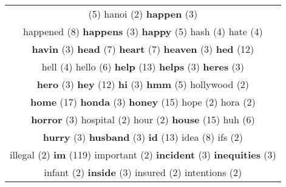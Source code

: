 \documentclass[12pt,a4paper]{article}
\begin{document}
\begin{center}
\begin{longtable}{|c|}
\footnotesize{(5)} {\footnotesize \textcolor{Verde} {hanoi}} \footnotesize{(2)} {\small \textcolor{Laranja} {\bf happen}} \footnotesize{(3)}  \\ {\huge \textcolor{Amarelo} {happened}} \footnotesize{(8)} {\small \textcolor{Laranja} {\bf happens}} \footnotesize{(3)} {\large \textcolor{Roxo} {\bf happy}} \footnotesize{(5)} {\normalsize \textcolor{VerdeLocao} {hash}} \footnotesize{(4)} {\normalsize \textcolor{VerdeLocao} {hate}} \footnotesize{(4)}  \\ {\small \textcolor{Laranja} {\bf havin}} \footnotesize{(3)} {\LARGE \textcolor{Rosa} {\bf head}} \footnotesize{(7)} {\LARGE \textcolor{Rosa} {\bf heart}} \footnotesize{(7)} {\small \textcolor{Laranja} {\bf heaven}} \footnotesize{(3)} {\Huge \textcolor{AzulEscuro} {\bf hed}} \footnotesize{(12)}  \\ {\normalsize \textcolor{VerdeLocao} {hell}} \footnotesize{(4)} {\Large \textcolor{VermEscuro} {hello}} \footnotesize{(6)} {\Huge \textcolor{AzulEscuro} {\bf help}} \footnotesize{(13)} {\small \textcolor{Laranja} {\bf helps}} \footnotesize{(3)} {\small \textcolor{Laranja} {\bf heres}} \footnotesize{(3)}  \\ {\small \textcolor{Laranja} {\bf hero}} \footnotesize{(3)} {\Huge \textcolor{AzulEscuro} {\bf hey}} \footnotesize{(12)} {\small \textcolor{Laranja} {\bf hi}} \footnotesize{(3)} {\large \textcolor{Roxo} {\bf hmm}} \footnotesize{(5)} {\footnotesize \textcolor{Verde} {hollywood}} \footnotesize{(2)}  \\ {\Huge \textcolor{AzulEscuro} {\bf home}} \footnotesize{(17)} {\small \textcolor{Laranja} {\bf honda}} \footnotesize{(3)} {\Huge \textcolor{AzulEscuro} {\bf honey}} \footnotesize{(15)} {\footnotesize \textcolor{Verde} {hope}} \footnotesize{(2)} {\footnotesize \textcolor{Verde} {hora}} \footnotesize{(2)}  \\ {\small \textcolor{Laranja} {\bf horror}} \footnotesize{(3)} {\footnotesize \textcolor{Verde} {hospital}} \footnotesize{(2)} {\footnotesize \textcolor{Verde} {hour}} \footnotesize{(2)} {\Huge \textcolor{AzulEscuro} {\bf house}} \footnotesize{(15)} {\Large \textcolor{VermEscuro} {huh}} \footnotesize{(6)}  \\ {\small \textcolor{Laranja} {\bf hurry}} \footnotesize{(3)} {\small \textcolor{Laranja} {\bf husband}} \footnotesize{(3)} {\Huge \textcolor{AzulEscuro} {\bf id}} \footnotesize{(13)} {\huge \textcolor{Amarelo} {idea}} \footnotesize{(8)} {\footnotesize \textcolor{Verde} {ifs}} \footnotesize{(2)}  \\ {\footnotesize \textcolor{Verde} {illegal}} \footnotesize{(2)} {\Huge \textcolor{AzulEscuro} {\bf im}} \footnotesize{(119)} {\footnotesize \textcolor{Verde} {important}} \footnotesize{(2)} {\small \textcolor{Laranja} {\bf incident}} \footnotesize{(3)} {\small \textcolor{Laranja} {\bf inequities}} \footnotesize{(3)}  \\ {\footnotesize \textcolor{Verde} {infant}} \footnotesize{(2)} {\small \textcolor{Laranja} {\bf inside}} \footnotesize{(3)} {\footnotesize \textcolor{Verde} {insured}} \footnotesize{(2)} {\footnotesize \textcolor{Verde} {intentions}} \footnotesize{(2)} 
\end{longtable}
\end{center}
\end{document}

